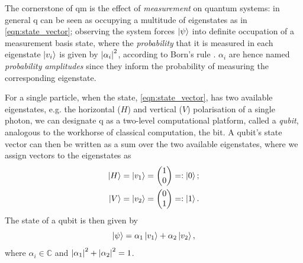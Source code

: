 The cornerstone of \gls{qm} is the effect of \emph{measurement} on quantum systems: 
    in general \gls{q} can be seen as occupying a multitude of eigenstates as in \cref{eqn:state_vector};
    observing the system forces $\ket{\psi}$ into definite occupation of a measurement basis state,
    where the \emph{probability} that it is measured in each eigenstate $\ket{v_i}$ is given by $\left\lvert \alpha_i \right\rvert^2$, 
    according to Born's rule \cite{born1926quantenmechanik}.
$\alpha_i$ are hence named \emph{probability amplitudes} since they inform the probability of measuring the corresponding eigenstate. 
\par 

For a single particle, when the state, \cref{eqn:state_vector}, has two available eigenstates, 
    e.g. the horizontal ($H$) and vertical ($V$) polarisation of a single photon, 
    we can designate \gls{q} as a two-level computational platform, called a \emph{qubit}\footnotemark, 
    analogous to the workhorse of classical computation, the bit. 
A qubit's state vector can then be written as a sum over the two available eigenstates, 
    where we assign vectors to the eigenstates as 
\begin{equation}
    \begin{split}
        \ket{H} = \ket{v_1} = \left(\begin{matrix}1 \\ 0 \end{matrix}\right) =: \ket{0}; \\
        \ket{V} = \ket{v_2} = \left(\begin{matrix}0 \\ 1\end{matrix}\right) =: \ket{1}. 
    \end{split}
\end{equation}
The state of a qubit is then given by 
\begin{equation}
    \label{eqn:qubit_state}
    \ket{\psi} = \alpha_1 \ket{v_1} + \alpha_2 \ket{v_2},
\end{equation}
where $\alpha_i \in \mathbb{C}$ and $\left\lvert \alpha_1 \right\rvert^2 + \left\lvert \alpha_2 \right\rvert^2 = 1$. 
\par

